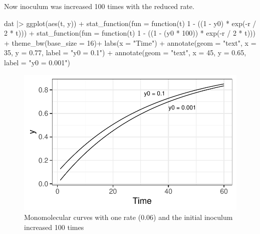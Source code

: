 \documentclass[
  letterpaper,
  DIV=11,
  numbers=noendperiod]{scrreprt}
\newenvironment{Shaded}{\begin{snugshade}}{\end{snugshade}}
\newcommand{\AttributeTok}[1]{\textcolor[rgb]{0.40,0.45,0.13}{#1}}
\newcommand{\ControlFlowTok}[1]{\textcolor[rgb]{0.00,0.23,0.31}{#1}}
\newcommand{\DecValTok}[1]{\textcolor[rgb]{0.68,0.00,0.00}{#1}}
\newcommand{\FloatTok}[1]{\textcolor[rgb]{0.68,0.00,0.00}{#1}}
\newcommand{\FunctionTok}[1]{\textcolor[rgb]{0.28,0.35,0.67}{#1}}
\newcommand{\NormalTok}[1]{\textcolor[rgb]{0.00,0.23,0.31}{#1}}
\newcommand{\SpecialCharTok}[1]{\textcolor[rgb]{0.37,0.37,0.37}{#1}}
\newcommand{\StringTok}[1]{\textcolor[rgb]{0.13,0.47,0.30}{#1}}
\begin{document}
Now inoculum was increased 100 times with the reduced rate.

\begin{Shaded}
\begin{Highlighting}[]
\NormalTok{dat }\SpecialCharTok{|\textgreater{}}
  \FunctionTok{ggplot}\NormalTok{(}\FunctionTok{aes}\NormalTok{(t, y)) }\SpecialCharTok{+}
  \FunctionTok{stat\_function}\NormalTok{(}\AttributeTok{fun =} \ControlFlowTok{function}\NormalTok{(t) }\DecValTok{1} \SpecialCharTok{{-}}\NormalTok{ ((}\DecValTok{1} \SpecialCharTok{{-}}\NormalTok{ y0) }\SpecialCharTok{*} \FunctionTok{exp}\NormalTok{(}\SpecialCharTok{{-}}\NormalTok{r }\SpecialCharTok{/} \DecValTok{2} \SpecialCharTok{*}\NormalTok{ t))) }\SpecialCharTok{+}
  \FunctionTok{stat\_function}\NormalTok{(}\AttributeTok{fun =} \ControlFlowTok{function}\NormalTok{(t) }\DecValTok{1} \SpecialCharTok{{-}}\NormalTok{ ((}\DecValTok{1} \SpecialCharTok{{-}}\NormalTok{ (y0 }\SpecialCharTok{*} \DecValTok{100}\NormalTok{)) }\SpecialCharTok{*} \FunctionTok{exp}\NormalTok{(}\SpecialCharTok{{-}}\NormalTok{r }\SpecialCharTok{/} \DecValTok{2} \SpecialCharTok{*}\NormalTok{ t))) }\SpecialCharTok{+}
  \FunctionTok{theme\_bw}\NormalTok{(}\AttributeTok{base\_size =} \DecValTok{16}\NormalTok{)}\SpecialCharTok{+}
  \FunctionTok{labs}\NormalTok{(}\AttributeTok{x =} \StringTok{"Time"}\NormalTok{) }\SpecialCharTok{+}
  \FunctionTok{annotate}\NormalTok{(}\AttributeTok{geom =} \StringTok{"text"}\NormalTok{, }\AttributeTok{x =} \DecValTok{35}\NormalTok{, }\AttributeTok{y =} \FloatTok{0.77}\NormalTok{, }\AttributeTok{label =} \StringTok{"y0 = 0.1"}\NormalTok{) }\SpecialCharTok{+}
  \FunctionTok{annotate}\NormalTok{(}\AttributeTok{geom =} \StringTok{"text"}\NormalTok{, }\AttributeTok{x =} \DecValTok{45}\NormalTok{, }\AttributeTok{y =} \FloatTok{0.65}\NormalTok{, }\AttributeTok{label =} \StringTok{"y0 = 0.001"}\NormalTok{)}
\end{Highlighting}
\end{Shaded}

\begin{figure}[H]

{\centering \includegraphics{temporal-models_files/figure-pdf/fig-mono2-1.pdf}

}

\caption{\label{fig-mono2}Monomolecular curves with one rate (0.06) and
the initial inoculum increased 100 times}

\end{figure}
\end{document}
